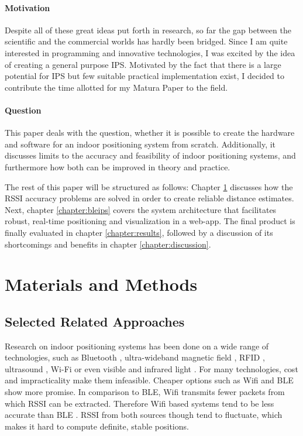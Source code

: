\documentclass[a4paper, oneside]{ipsreport}
\begin{document}
\subsubsection{Motivation}
Despite all of these great ideas put forth in research, so far the gap between the scientific and the commercial worlds has hardly been bridged. Since I am quite interested in programming and innovative technologies, I was excited by the idea of creating a general purpose IPS. Motivated by the fact that there is a large potential for IPS but few suitable practical implementation exist, I decided to contribute the time allotted for my Matura Paper to the field.

\subsubsection{Question}
This paper deals with the question, whether it is possible to create the hardware and software for an indoor positioning system from scratch. Additionally, it discusses limits to the accuracy and feasibility of indoor positioning systems, and furthermore how both can be improved in theory and practice.

The rest of this paper will be structured as follows: Chapter \ref{chapter:materialsAndMethods} discusses how the RSSI accuracy problems are solved in order to create reliable distance estimates. Next, chapter \ref{chapter:bleips} covers the system architecture that facilitates robust, real-time positioning and visualization in a web-app. The final product is finally evaluated in chapter \ref{chapter:results}, followed by a discussion of its shortcomings and benefits in chapter \ref{chapter:discussion}.

\chapter{Materials and Methods}
\label{chapter:materialsAndMethods}

\section{Selected Related Approaches}
\label{section:relatedWork}

Research on indoor positioning systems has been done on a wide range of technologies, such as Bluetooth \autocite{BLE}, ultra-wideband \autocite{UWB} magnetic field \autocite{Magnetic}, RFID \autocite{RFID}, ultrasound \autocite{Ultrasound}, Wi-Fi \autocite{IPSESP32Client} or even visible and infrared light \autocite{visiblelight}. For many technologies, cost and impracticality make them infeasible. Cheaper options such as  Wifi and BLE show more promise. In comparison to BLE, Wifi transmits fewer packets from which RSSI can be extracted. Therefore Wifi based systems tend to be less accurate than BLE \autocite{IPSESP32Client}. RSSI from both sources though tend to fluctuate, which makes it hard to compute definite, stable positions.
\end{document}
